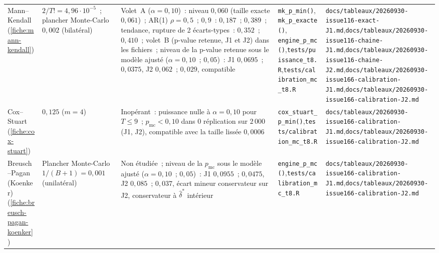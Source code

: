 \documentclass[a4paper,11pt]{article}
\newcommand{\code}[1]{\texttt{\small #1}}
\begin{document}
\begin{landscape}
\begin{center}
\begin{longtable}{@{}>{\raggedright\arraybackslash}p{2.5cm}>{\raggedright\arraybackslash}p{3.6cm}>{\raggedright\arraybackslash}p{4.0cm}>{\raggedright\arraybackslash}p{6.7cm}>{\raggedright\arraybackslash}p{7.2cm}@{}}
Mann--Kendall (\ref{fiche:mann-kendall}) & $2/T! = 4{,}96\cdot 10^{-5}$~; plancher Monte-Carlo $0{,}002$ (bilatéral) & Volet~A ($\alpha = 0{,}10$)~: niveau $0{,}060$ (taille exacte $0{,}061$)~; AR(1) $\rho = 0{,}5$~; $0{,}9$~: $0{,}187$~; $0{,}389$~; tendance, rupture de 2 écarts-types~: $0{,}352$~; $0{,}410$~; volet~B (p-value retenue, J1 et J2) dans les fichiers~; niveau de la p-value retenue sous le modèle ajusté ($\alpha = 0{,}10$~; $0{,}05$)~: J1 $0{,}0695$~; $0{,}0375$, J2 $0{,}062$~; $0{,}029$, compatible & \code{mk\_p\_min()}, \code{mk\_p\_exacte()}, \code{engine\_p\_mc()},\newline \code{tests/puissance\_t8.R},\newline \code{tests/calibration\_mc\_t8.R} & \code{docs/tableaux/}\newline \code{20260930-issue116-exact-J1.md},\newline \code{docs/tableaux/}\newline \code{20260930-issue116-chaine-J1.md},\newline \code{docs/tableaux/}\newline \code{20260930-issue116-chaine-J2.md},\newline \code{docs/tableaux/}\newline \code{20260930-issue166-calibration-J1.md},\newline \code{docs/tableaux/}\newline \code{20260930-issue166-calibration-J2.md} \\
Cox--Stuart (\ref{fiche:cox-stuart}) & $0{,}125$ ($m = 4$) & Inopérant~: puissance nulle à $\alpha = 0{,}10$ pour $T \le 9$~; $p_{\mathrm{mc}} < 0{,}10$ dans 0 réplication sur $2\,000$ (J1, J2), compatible avec la taille lissée $0{,}0006$ & \code{cox\_stuart\_p\_min()},\newline \code{tests/calibration\_mc\_t8.R} & \code{docs/tableaux/}\newline \code{20260930-issue166-calibration-J1.md},\newline \code{docs/tableaux/}\newline \code{20260930-issue166-calibration-J2.md} \\
Breusch--Pagan (Koenker) (\ref{fiche:breusch-pagan-koenker}) & Plancher Monte-Carlo $1/(B+1) = 0{,}001$ (unilatéral) & Non étudiée~; niveau de la $p_{\mathrm{mc}}$ sous le modèle ajusté ($\alpha = 0{,}10$~; $0{,}05$)~: J1 $0{,}0955$~; $0{,}0475$, J2 $0{,}085$~; $0{,}037$, écart mineur conservateur sur J2, conservateur à $\hat\delta^{*}$ intérieur & \code{engine\_p\_mc()},\newline \code{tests/calibration\_mc\_t8.R} & \code{docs/tableaux/}\newline \code{20260930-issue166-calibration-J1.md},\newline \code{docs/tableaux/}\newline \code{20260930-issue166-calibration-J2.md} \\

\end{longtable}
\end{center}
\end{landscape}
\end{document}
